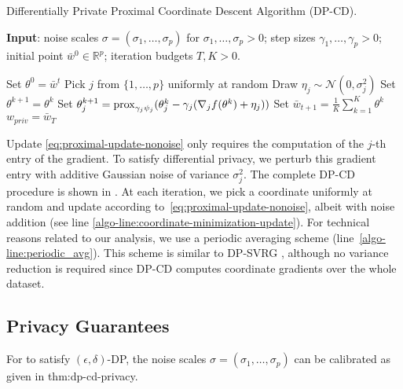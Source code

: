 \begin{algorithm*}[t]
  \caption{Differentially Private Proximal Coordinate Descent Algorithm
    (DP-CD).}
  \label{algo:dp-cd}
  \textbf{Input}:
  noise scales $\sigma = (\sigma_1, \dots, \sigma_p)$ for $\sigma_1,\dots,\sigma_p > 0$;
  step sizes $\gamma_1,\dots,\gamma_p > 0$;
  initial point $\bar w^0 \in \mathbb{R}^p$;
  iteration budgets $T, K > 0$.
  \begin{algorithmic}[1]
    \State Set $\theta^0 = \bar w^t$
    \State Pick $j$ from $\{1, \dots, p\}$ uniformly at random
    \State Draw $\eta_j \sim \mathcal N(0, \sigma_j^2)$
    \label{algo-line:noise-generation}
    \State Set $\theta^{k+1} = \theta^k$
    \State Set $\theta^{k+1}_{j} = \operatorname{prox}_{\gamma_{j}\psi_{j}} (\theta^{k}_{j} -
      \gamma_{j} (\nabla_{j} f(\theta^k) + \eta_j))$
    \label{algo-line:coordinate-minimization-update}
    \vspace*{-.02cm}
    \EndFor
    \State Set $\bar w_{t+1} = \frac 1K \sum_{k=1}^K \theta^k$
    \label{algo-line:periodic_avg}
    \EndFor
    \State \Return $ w_{priv} = \bar w_T$
  \end{algorithmic}
\end{algorithm*}
Update \eqref{eq:proximal-update-nonoise} only requires the computation of the
$j$-th entry of the gradient. To satisfy differential privacy, we perturb this
gradient entry with additive Gaussian noise of variance $\sigma_j^2$.
The complete DP-CD procedure is shown in .
At each iteration, we pick a coordinate uniformly at random
and update according to~\eqref{eq:proximal-update-nonoise}, albeit with noise
addition (see line \ref{algo-line:coordinate-minimization-update}).
For technical reasons related to our analysis, we use a
periodic averaging scheme (line~\ref{algo-line:periodic_avg}).
This scheme is similar to DP-SVRG \citep{johnson2013Accelerating}, although
no variance reduction is required since DP-CD computes coordinate gradients
over the whole dataset.



\subsection{Privacy Guarantees}
\label{sec:privacy-guarantees}

For  to satisfy $(\epsilon,\delta)$-DP, the noise scales
$\sigma=(\sigma_1,\dots,\sigma_p)$ can be calibrated as given in \Cref
{thm:dp-cd-privacy}. %

